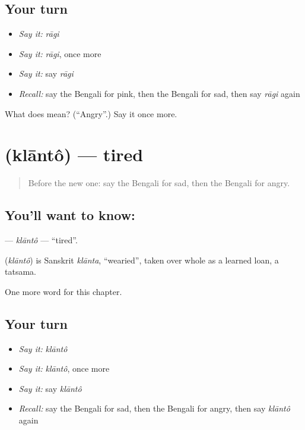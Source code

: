 \subsection*{Your turn}
\begin{itemize}
\raggedright
  \item \emph{Say it:} \emph{rāgi}
  \item \emph{Say it:} \emph{rāgi}, once more
  \item \emph{Say it:} say \emph{rāgi}
  \item \emph{Recall:} say the Bengali for pink, then the Bengali for sad, then say \emph{rāgi} again
\end{itemize}

\begin{tcolorbox}[breakable,colback=teal!4,colframe=teal!35!black,title={Before you move on}]
What does  mean? (\textquotedblleft{}Angry\textquotedblright{}.) Say it once more.
\end{tcolorbox}
\section[\texorpdfstring{\bn{ক্লান্ত} (klāntô)}{ক্লান্ত (klāntô)}]{ (klāntô) — tired}

\label{lesson:BN-C137-klanto}



\begin{quote}
Before the new one: say the Bengali for sad, then the Bengali for angry.
\end{quote}

\subsection*{You'll want to know: }
\textbf{} — \emph{klāntô} — \textquotedblleft{}tired\textquotedblright{}.

\begin{cousinweb}
\textbf{} (\emph{klāntô}) is Sanskrit \emph{klānta}, \textquotedblleft{}wearied\textquotedblright{}, taken over whole as a learned loan, a tatsama.
\end{cousinweb}

\begin{grammarlens}[title={What you've built}]
One more word for this chapter.
\end{grammarlens}

\subsection*{Your turn}
\begin{itemize}
\raggedright
  \item \emph{Say it:} \emph{klāntô}
  \item \emph{Say it:} \emph{klāntô}, once more
  \item \emph{Say it:} say \emph{klāntô}
  \item \emph{Recall:} say the Bengali for sad, then the Bengali for angry, then say \emph{klāntô} again
\end{itemize}

